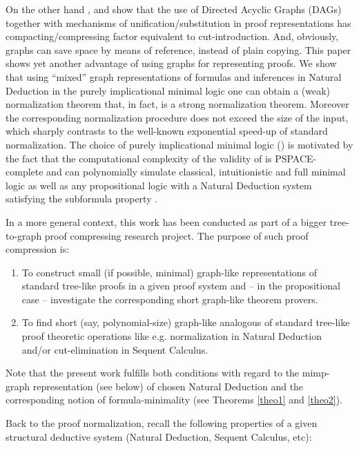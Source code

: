 \documentclass[submission,copyright,creativecommons]{eptcs}
\begin{document}
On the other hand \cite{Finger2005}, \cite{Vaston07} and \cite{Gordeev2009}
show that the use of Directed Acyclic Graphs (DAGs) together with mechanisms
of unification/substitution in proof representations has
compacting/compressing factor equivalent to cut-introduction. And,
obviously, graphs can save space by means of reference, instead of plain
copying. This paper shows yet another advantage of using graphs for
representing proofs. We show that using ``mixed'' graph representations of
formulas and inferences in Natural Deduction in the purely implicational
minimal logic one can obtain a (weak) normalization theorem that, in fact,
is a strong normalization theorem. Moreover the corresponding normalization
procedure does not exceed the size of the input, which sharply contrasts to
the well-known exponential speed-up of standard normalization. The choice of
purely implicational minimal logic () is motivated by the
fact that the computational complexity of the validity of 
is PSPACE-complete and can polynomially simulate classical, intuitionistic
and full minimal logic \cite{Statman79} as well as any propositional
logic with a Natural Deduction system satisfying the subformula property  
\cite{Haeusler2013}.

In a more general context, this work has been conducted as part of a bigger
tree-to-graph proof compressing research project. The purpose of such proof
compression is:

\begin{enumerate}
\item  To construct small (if possible, minimal) graph-like representations
of standard tree-like proofs in a given proof system and -- in the
propositional case -- investigate the corresponding short graph-like theorem
provers.

\item  To find short (say, polynomial-size) graph-like analogous of
standard tree-like proof theoretic operations like e.g. normalization in
Natural Deduction and/or cut-elimination in Sequent Calculus.
\end{enumerate}

Note that the present work fulfills both conditions with regard to the mimp-graph
representation (see below) of chosen Natural Deduction and the corresponding
notion of formula-minimality (see Theorems \ref{theo1} and \ref{theo2}).

Back to the proof normalization, recall the following properties of a given
structural deductive system (Natural Deduction, Sequent Calculus, etc):
\end{document}

